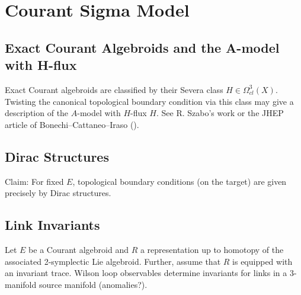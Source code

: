 \section{Courant Sigma Model}


\subsection{Exact Courant Algebroids and the A-model with H-flux}

Exact Courant algebroids are classified by their Severa class $H \in \Omega^3_{cl} (X)$.  Twisting the canonical topological boundary condition via this class may give a description of the $A$-model with $H$-flux $H$. See R. Szabo's work or the JHEP article of Bonechi--Cattaneo--Iraso ().

\subsection{Dirac Structures}

Claim: For fixed $E$, topological boundary conditions (on the target) are given precisely by Dirac structures. 


\subsection{Link Invariants}

Let $E$ be a Courant algebroid and $R$ a representation up to homotopy of the associated 2-symplectic Lie algebroid.  Further, assume that $R$ is equipped with an invariant trace.  Wilson loop observables determine invariants for links in a 3-manifold source manifold (anomalies?).


